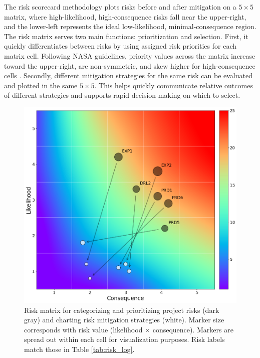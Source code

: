The risk scorecard methodology plots risks before and after mitigation on a $5\times5$ matrix, where high-likelihood, high-consequence risks fall near the upper-right, and the lower-left represents the ideal low-likelihood, minimal-consequence region. The risk matrix serves two main functions: prioritization and selection. First, it quickly differentiates between risks by using assigned risk priorities for each matrix cell. Following NASA guidelines, priority values across the matrix increase toward the upper-right, are non-symmetric, and skew higher for high-consequence cells \citep{nasa_s3001_2017}. Secondly, different mitigation strategies for the same risk can be evaluated and plotted in the same $5\times5$. This helps quickly communicate relative outcomes of different strategies and supports rapid decision-making on which to select.

\begin{figure}%
\centering
\includegraphics[width=\linewidth]{templates/images/Figure-Risk_Matrix.png}
\caption[Geothermal project risk matrix]{Risk matrix for categorizing and prioritizing project risks (dark gray) and charting risk mitigation strategies (white). Marker size corresponds with risk value (likelihood $\times$ consequence). Markers are spread out within each cell for visualization purposes. Risk labels match those in Table \ref{tab:risk_log}.}
\label{fig:risk_matrix}
\end{figure}

